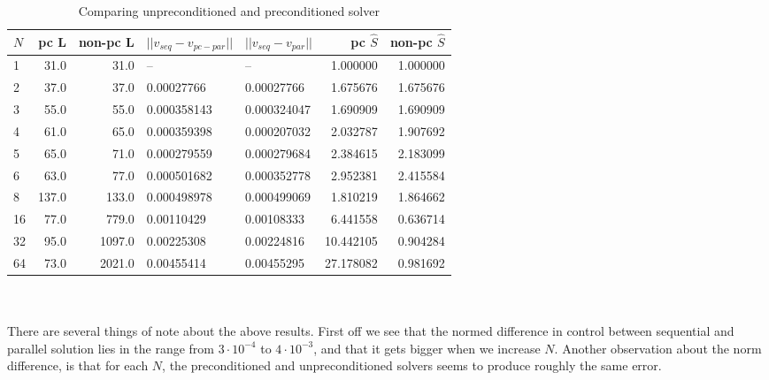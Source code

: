 \begin{table}[h]
\centering
\caption{Comparing unpreconditioned and preconditioned solver}
\begin{tabular}{lrrllrr}
\toprule
{}$N$ &  pc L &  non-pc L &       $||v_{seq}-v_{pc-par}||$ &  $||v_{seq}-v_{par}||$  &  pc $\hat{S}$ &  non-pc $\hat{S}$ \\
\midrule
1  &     31.0 &      31.0 &           -- &           -- &    1.000000 &        1.000000 \\
2  &     37.0 &      37.0 &   0.00027766 &   0.00027766 &    1.675676 &        1.675676 \\
3  &     55.0 &      55.0 &  0.000358143 &  0.000324047 &    1.690909 &        1.690909 \\
4  &     61.0 &      65.0 &  0.000359398 &  0.000207032 &    2.032787 &        1.907692 \\
5  &     65.0 &      71.0 &  0.000279559 &  0.000279684 &    2.384615 &        2.183099 \\
6  &     63.0 &      77.0 &  0.000501682 &  0.000352778 &    2.952381 &        2.415584 \\
8  &    137.0 &     133.0 &  0.000498978 &  0.000499069 &    1.810219 &        1.864662 \\
16 &     77.0 &     779.0 &   0.00110429 &   0.00108333 &    6.441558 &        0.636714 \\
32 &     95.0 &    1097.0 &   0.00225308 &   0.00224816 &   10.442105 &        0.904284 \\
64 &     73.0 &    2021.0 &   0.00455414 &   0.00455295 &   27.178082 &        0.981692 \\
\bottomrule
\end{tabular}
\end{table}
\\
\\
There are several things of note about the above results. First off we see that the normed difference in control between sequential and parallel solution lies in the range from $3\cdot 10^{-4}$ to $4\cdot 10^{-3}$, and that it gets bigger when we increase $N$. Another observation about the norm difference, is that for each $N$, the preconditioned and unpreconditioned solvers seems to produce roughly the same error. 
\\
\\
